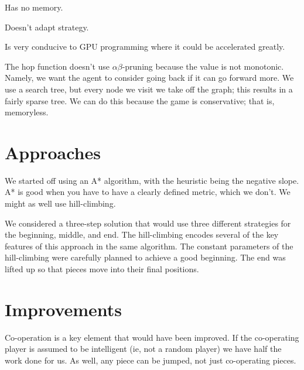 \documentclass[twocolumn]{article}
\begin{document}
Has no memory.

Doesn't adapt strategy.

Is very conducive to GPU programming where it could be accelerated greatly.

The hop function doesn't use $\alpha\beta$-pruning because the value is not monotonic. Namely, we want the agent to consider going back if it can go forward more. We use a search tree, but every node we visit we take off the graph; this results in a fairly sparse tree. We can do this because the game is conservative; that is, memoryless.

\section{Approaches}


We started off using an A* algorithm, with the heuristic being the negative slope. A* is good when you have to have a clearly defined metric, which we don't. We might as well use hill-climbing.\cite{}

We considered a three-step solution that would use three different strategies for the beginning, middle, and end. The hill-climbing encodes several of the key features of this approach in the same algorithm. The constant parameters of the hill-climbing were carefully planned to achieve a good beginning. The end was lifted up so that pieces move into their final positions.


\section{Improvements}


Co-operation is a key element that would have been improved. If the co-operating player is assumed to be intelligent (ie, not a random player) we have half the work done for us. As well, any piece can be jumped, not just co-operating pieces.
\end{document}
